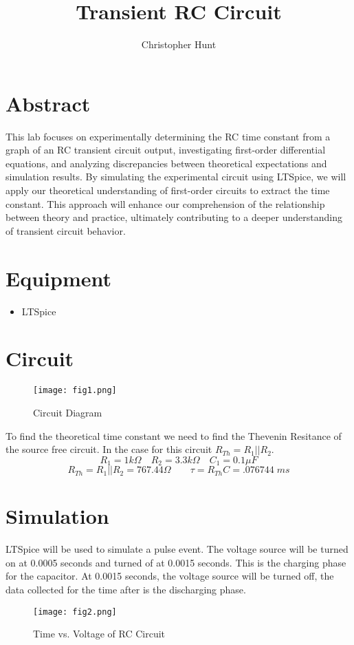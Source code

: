 \documentclass[11pt]{article}
\title{Transient RC Circuit}
\author{Christopher Hunt}
\date{}
\begin{document}
\pagestyle{fancy}
\fancyhf{}
\rhead{\thepage}
\maketitle

\section*{Abstract}
This lab focuses on experimentally determining the RC time constant from a graph of an RC transient circuit output, investigating first-order differential equations, and analyzing discrepancies between theoretical expectations and simulation results. By simulating the experimental circuit using LTSpice, we will apply our theoretical understanding of first-order circuits to extract the time constant. This approach will enhance our comprehension of the relationship between theory and practice, ultimately contributing to a deeper understanding of transient circuit behavior.

\section*{Equipment}
\begin{itemize}
    \item LTSpice
\end{itemize}

\section*{Circuit}
\begin{figure}[H]
  \centering
  \texttt{[image: fig1.png]}
  \caption{Circuit Diagram}
  \label{fig:1}
\end{figure}
To find the theoretical time constant we need to find the Thevenin Resitance of the source free circuit. In the case for this circuit $R_{Th} = R_1 || R_2$.
$$R_1 = 1k \Omega \quad R_2 = 3.3k\Omega \quad C_1 = 0.1 \mu F$$
$$R_{Th} = R_1 || R_2=767.44 \Omega \qquad \tau=R_{Th}C = .076744 \; ms$$

\section*{Simulation}
LTSpice will be used to simulate a pulse event. The voltage source will be turned on at 0.0005 seconds and turned of at 0.0015 seconds. This is the charging phase for the capacitor. At 0.0015 seconds, the voltage source will be turned off, the data collected for the time after is the discharging phase.
\begin{figure}[H]
  \centering
  \texttt{[image: fig2.png]}
  \caption{Time vs. Voltage of RC Circuit}
  \label{fig:2}
\end{figure}
\end{document}
